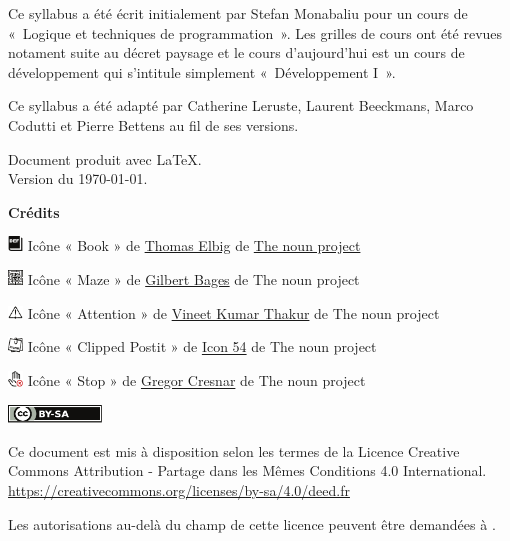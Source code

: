 
\thispagestyle{empty}

Ce syllabus a été écrit initialement par Stefan Monabaliu pour un cours de
«~Logique et techniques de programmation~». Les grilles de cours ont été revues
notament suite au décret paysage et le cours d'aujourd'hui est un cours de
développement qui s'intitule simplement «~Développement I~».

Ce syllabus a été adapté par Catherine Leruste, Laurent Beeckmans, Marco
Codutti et Pierre Bettens au fil de ses versions. 

\bigskip
\noindent
Document produit avec \LaTeX.
\\Version du \today.

\vfill

\textbf{Crédits}

\includegraphics[width=4mm]{icon/definition}
Icône « Book » de 
\href{https://thenounproject.com/dergraph}{Thomas Elbig} de 
\href{https://thenounproject.com}{The noun project}

\includegraphics[width=4mm]{icon/reflexion}
Icône « Maze » de 
\href{https://thenounproject.com/gilbertbages}{Gilbert Bages} de 
The noun project

\includegraphics[width=4mm]{icon/attention}
Icône « Attention » de 
\href{https://thenounproject.com/vkvineet}{Vineet Kumar Thakur} de
The noun project

\includegraphics[width=4mm]{icon/fiche}
Icône « Clipped Postit » de 
\href{https://thenounproject.com/icon54app/}{Icon 54} de
The noun project

\includegraphics[width=4mm]{icon/dont}
Icône « Stop » de 
\href{https://thenounproject.com/grega.cresnar}{Gregor Cresnar} de
The noun project




\vspace{1cm}
\includegraphics[width=25mm]{images/cc-by-sa}

Ce document est mis à disposition selon les termes de la Licence Creative
\\Commons Attribution - Partage dans les Mêmes Conditions 4.0 International.
\\\url{https://creativecommons.org/licenses/by-sa/4.0/deed.fr}

Les autorisations au-delà du champ de cette licence
peuvent être demandées à \texttt{\contact}.

